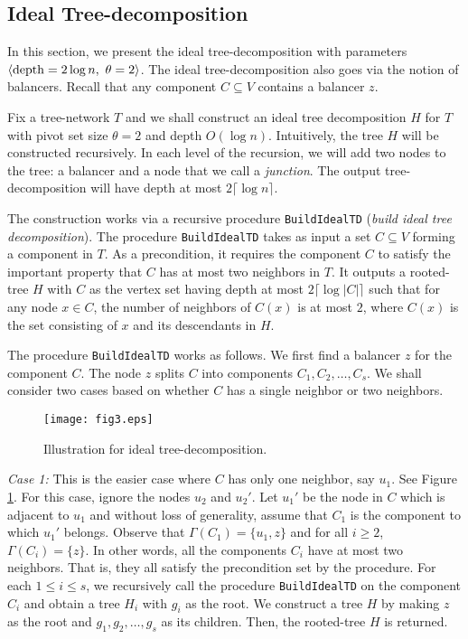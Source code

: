 \documentclass[11pt]{article}
\newcommand{\pair}[2] {\langle #1,#2 \rangle}
\newcommand{\BuildITD} {{\tt BuildIdealTD}}
\newcommand{\ceil}[1] {\lceil #1 \rceil}
\newcommand{\depth} {{\rm depth}}
\begin{document}
\subsection{Ideal Tree-decomposition}
In this section, we present the ideal tree-decomposition with parameters $\pair{\depth=2\log n}{~\theta=2}$.
The ideal tree-decomposition also goes via the notion of balancers.
Recall that any component $C\subseteq V$ contains a balancer $z$.

Fix a tree-network $T$ and we shall construct an ideal tree decomposition $H$ for $T$ with pivot set size $\theta=2$
and depth $O(\log n)$. Intuitively, the tree $H$ will be constructed recursively.
In each level of the recursion, we will add two nodes to the tree: a balancer and a node that we call a {\em junction}.
The output tree-decomposition will have depth at most $2\ceil{\log n}$.

The construction works via a recursive procedure {\BuildITD} ({\em build ideal tree decomposition}).
The procedure {\BuildITD} takes as input a set $C\subseteq V$ forming a component in $T$.
As a precondition, it requires the component $C$ to satisfy the important property that $C$ has at most
two neighbors in $T$.
It outputs a rooted-tree $H$ with $C$ as the vertex set
having depth at most $2\ceil{\log |C|}$ such that for any node $x\in C$, 
the number of neighbors of $C(x)$ is at most $2$,
where $C(x)$ is the set consisting of $x$ and its descendants in $H$.

The procedure {\BuildITD} works as follows. We first find a balancer $z$ for the component $C$.
The node $z$ splits $C$ into components $C_1, C_2, \ldots, C_s$. 
We shall consider two cases based on whether $C$ has a single neighbor or two neighbors.

\begin{figure}[t]
\centering
\texttt{[image: fig3.eps]}
\caption{Illustration for ideal tree-decomposition.}
\label{fig:3}
\end{figure}

{\it Case 1: }This is the easier case where $C$ has only one neighbor, say $u_1$.
See Figure \ref{fig:3}. For this case, ignore the nodes $u_2$ and $u_2'$.
Let $u_1'$ be the node in $C$ which is adjacent to $u_1$ and 
without loss of generality, assume that $C_1$ is the component to which $u_1'$ belongs.
Observe that $\Gamma(C_1)=\{u_1,z\}$ and for all $i\geq 2$, $\Gamma(C_i)=\{z\}$.
In other words, all the components $C_i$ have at most two neighbors.
That is, they all satisfy the precondition set by the procedure.
For each $1\leq i\leq s$, we recursively call the procedure {\BuildITD} on the component $C_i$
and obtain a tree $H_i$ with $g_i$ as the root. 
We construct a tree $H$ by making $z$ as the root and $g_1, g_2,\ldots, g_s$ as its children. 
Then, the rooted-tree $H$ is returned. 
\end{document}
